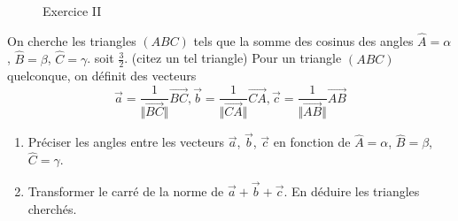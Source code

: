 \begin{figure}
\centering

\caption{Exercice II}
\end{figure} 
On cherche les triangles $(ABC)$ tels que la somme des cosinus des angles $\widehat{A}=\alpha$, $\widehat{B}=\beta$, $\widehat{C}=\gamma$. soit $\frac{3}{2}$. (citez un tel triangle)\newline
Pour un triangle $(ABC)$ quelconque, on définit des vecteurs 
\[
\overrightarrow{a}=\frac{1}{\Vert\overrightarrow{BC}\Vert}\overrightarrow{BC} , 
\overrightarrow{b}=\frac{1}{\Vert\overrightarrow{CA}\Vert}\overrightarrow{CA} , 
\overrightarrow{c}=\frac{1}{\Vert\overrightarrow{AB}\Vert}\overrightarrow{AB} 
\]
\begin{enumerate}
\item Préciser les angles entre les vecteurs $\overrightarrow{a}$, $\overrightarrow{b}$, $\overrightarrow{c}$ en fonction de $\widehat{A}=\alpha$, $\widehat{B}=\beta$, $\widehat{C}=\gamma$.
\item Transformer le carré de la norme de $\overrightarrow{a}+\overrightarrow{b}+\overrightarrow{c}$. En déduire les triangles cherchés.
\end{enumerate}
